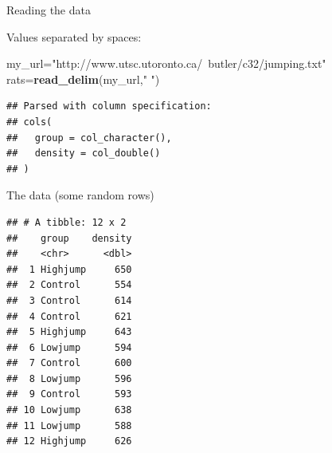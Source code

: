 \documentclass[ignorenonframetext,]{beamer}
\newenvironment{Shaded}{\begin{snugshade}}{\end{snugshade}}
\newcommand{\DecValTok}[1]{\textcolor[rgb]{0.00,0.00,0.81}{#1}}
\newcommand{\KeywordTok}[1]{\textcolor[rgb]{0.13,0.29,0.53}{\textbf{#1}}}
\newcommand{\NormalTok}[1]{#1}
\newcommand{\OperatorTok}[1]{\textcolor[rgb]{0.81,0.36,0.00}{\textbf{#1}}}
\newcommand{\StringTok}[1]{\textcolor[rgb]{0.31,0.60,0.02}{#1}}
\begin{document}
\begin{frame}[fragile]{Reading the data}
\protect\hypertarget{reading-the-data}{}

Values separated by spaces:

\begin{Shaded}
\begin{Highlighting}[]
\NormalTok{my_url=}\StringTok{"http://www.utsc.utoronto.ca/~butler/c32/jumping.txt"}
\NormalTok{rats=}\KeywordTok{read_delim}\NormalTok{(my_url,}\StringTok{" "}\NormalTok{)}
\end{Highlighting}
\end{Shaded}

\begin{verbatim}
## Parsed with column specification:
## cols(
##   group = col_character(),
##   density = col_double()
## )
\end{verbatim}

\end{frame}

\begin{frame}[fragile]{The data (some random rows)}
\protect\hypertarget{the-data-some-random-rows}{}

\small

\begin{Shaded}
\end{Shaded}

\begin{verbatim}
## # A tibble: 12 x 2
##    group    density
##    <chr>      <dbl>
##  1 Highjump     650
##  2 Control      554
##  3 Control      614
##  4 Control      621
##  5 Highjump     643
##  6 Lowjump      594
##  7 Control      600
##  8 Lowjump      596
##  9 Control      593
## 10 Lowjump      638
## 11 Lowjump      588
## 12 Highjump     626
\end{verbatim}

\normalsize

\end{frame}
\end{document}
